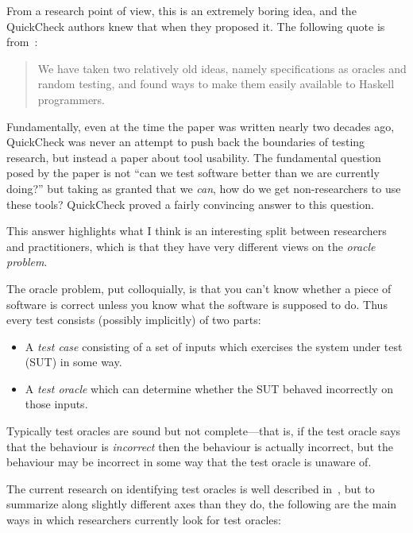 From a research point of view,
this is an extremely boring idea,
and the QuickCheck authors knew that when they proposed it.
The following quote is from~\cite{DBLP:conf/icfp/ClaessenH00}:

\begin{quote}
We have taken two relatively old ideas, namely specifications
as oracles and random testing, and found ways to make
them easily available to Haskell programmers.
\end{quote}

Fundamentally,
even at the time the paper was written nearly two decades ago,
QuickCheck was never an attempt to push back the boundaries of testing research,
but instead a paper about tool usability.
The fundamental question posed by the paper is not ``can we test software better than we are currently doing?'' but taking as granted that we \emph{can},
how do we get non-researchers to use these tools?
QuickCheck proved a fairly convincing answer to this question.

This answer highlights what I think is an interesting split between researchers and practitioners,
which is that they have very different views on the \emph{oracle problem}.

The oracle problem, put colloquially, is that you can't know whether a piece of software is correct unless you know what the software is supposed to do.
Thus every test consists (possibly implicitly) of two parts:

\begin{itemize}
\item A \emph{test case} consisting of a set of inputs which exercises the system under test (SUT) in some way.
\item A \emph{test oracle} which can determine whether the SUT behaved incorrectly on those inputs.
\end{itemize}

Typically test oracles are sound but not complete---that is,
if the test oracle says that the behaviour is \emph{incorrect} then the behaviour is actually incorrect,
but the behaviour may be incorrect in some way that the test oracle is unaware of.

The current research on identifying test oracles is well described in~\cite{DBLP:journals/tse/BarrHMSY15},
but to summarize along slightly different axes than they do,
the following are the main ways in which researchers currently look for test oracles:

